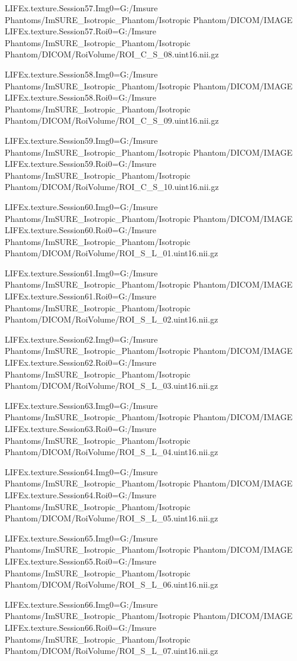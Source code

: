 LIFEx.texture.Session57.Img0=G:/Imsure Phantoms/ImSURE_Isotropic_Phantom/Isotropic Phantom/DICOM/IMAGE
LIFEx.texture.Session57.Roi0=G:/Imsure Phantoms/ImSURE_Isotropic_Phantom/Isotropic Phantom/DICOM/RoiVolume/ROI_C_S_08.uint16.nii.gz

LIFEx.texture.Session58.Img0=G:/Imsure Phantoms/ImSURE_Isotropic_Phantom/Isotropic Phantom/DICOM/IMAGE
LIFEx.texture.Session58.Roi0=G:/Imsure Phantoms/ImSURE_Isotropic_Phantom/Isotropic Phantom/DICOM/RoiVolume/ROI_C_S_09.uint16.nii.gz

LIFEx.texture.Session59.Img0=G:/Imsure Phantoms/ImSURE_Isotropic_Phantom/Isotropic Phantom/DICOM/IMAGE
LIFEx.texture.Session59.Roi0=G:/Imsure Phantoms/ImSURE_Isotropic_Phantom/Isotropic Phantom/DICOM/RoiVolume/ROI_C_S_10.uint16.nii.gz

LIFEx.texture.Session60.Img0=G:/Imsure Phantoms/ImSURE_Isotropic_Phantom/Isotropic Phantom/DICOM/IMAGE
LIFEx.texture.Session60.Roi0=G:/Imsure Phantoms/ImSURE_Isotropic_Phantom/Isotropic Phantom/DICOM/RoiVolume/ROI_S_L_01.uint16.nii.gz

LIFEx.texture.Session61.Img0=G:/Imsure Phantoms/ImSURE_Isotropic_Phantom/Isotropic Phantom/DICOM/IMAGE
LIFEx.texture.Session61.Roi0=G:/Imsure Phantoms/ImSURE_Isotropic_Phantom/Isotropic Phantom/DICOM/RoiVolume/ROI_S_L_02.uint16.nii.gz

LIFEx.texture.Session62.Img0=G:/Imsure Phantoms/ImSURE_Isotropic_Phantom/Isotropic Phantom/DICOM/IMAGE
LIFEx.texture.Session62.Roi0=G:/Imsure Phantoms/ImSURE_Isotropic_Phantom/Isotropic Phantom/DICOM/RoiVolume/ROI_S_L_03.uint16.nii.gz

LIFEx.texture.Session63.Img0=G:/Imsure Phantoms/ImSURE_Isotropic_Phantom/Isotropic Phantom/DICOM/IMAGE
LIFEx.texture.Session63.Roi0=G:/Imsure Phantoms/ImSURE_Isotropic_Phantom/Isotropic Phantom/DICOM/RoiVolume/ROI_S_L_04.uint16.nii.gz

LIFEx.texture.Session64.Img0=G:/Imsure Phantoms/ImSURE_Isotropic_Phantom/Isotropic Phantom/DICOM/IMAGE
LIFEx.texture.Session64.Roi0=G:/Imsure Phantoms/ImSURE_Isotropic_Phantom/Isotropic Phantom/DICOM/RoiVolume/ROI_S_L_05.uint16.nii.gz

LIFEx.texture.Session65.Img0=G:/Imsure Phantoms/ImSURE_Isotropic_Phantom/Isotropic Phantom/DICOM/IMAGE
LIFEx.texture.Session65.Roi0=G:/Imsure Phantoms/ImSURE_Isotropic_Phantom/Isotropic Phantom/DICOM/RoiVolume/ROI_S_L_06.uint16.nii.gz

LIFEx.texture.Session66.Img0=G:/Imsure Phantoms/ImSURE_Isotropic_Phantom/Isotropic Phantom/DICOM/IMAGE
LIFEx.texture.Session66.Roi0=G:/Imsure Phantoms/ImSURE_Isotropic_Phantom/Isotropic Phantom/DICOM/RoiVolume/ROI_S_L_07.uint16.nii.gz

